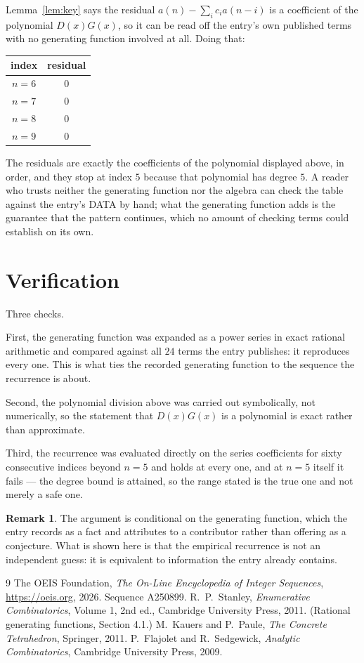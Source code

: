 \documentclass[11pt,a4paper]{article}
\theoremstyle{plain}
\theoremstyle{definition}
\newtheorem{remark}[theorem]{Remark}
\begin{document}
Lemma~\ref{lem:key} says the residual $a(n)-\sum_ic_ia(n-i)$ is a coefficient of the
polynomial $D(x)G(x)$, so it can be read off the entry's own published terms with no
generating function involved at all. Doing that:
\begin{center}
\begin{tabular}{cc}
index & residual \\ \hline
$n=6$ & $0$ \\
$n=7$ & $0$ \\
$n=8$ & $0$ \\
$n=9$ & $0$
\end{tabular}
\end{center}
The residuals are exactly the coefficients of the polynomial displayed above, in order, and
they stop at index $5$ because that polynomial has degree $5$. A reader who trusts
neither the generating function nor the algebra can check the table against the entry's DATA
by hand; what the generating function adds is the guarantee that the pattern continues, which
no amount of checking terms could establish on its own.

\section{Verification}

Three checks.

First, the generating function was expanded as a power series in exact rational arithmetic and
compared against all $24$ terms the entry publishes: it reproduces every one. This is
what ties the recorded generating function to the sequence the recurrence is about.

Second, the polynomial division above was carried out symbolically, not numerically, so the
statement that $D(x)G(x)$ is a polynomial is exact rather than approximate.

Third, the recurrence was evaluated directly on the series coefficients for sixty consecutive
indices beyond $n=5$ and holds at every one, and at $n=5$ itself it fails --- the
degree bound is attained, so the range stated is the true one and not merely a safe one.

\begin{remark}
The argument is conditional on the generating function, which the entry records as a fact and
attributes to a contributor rather than offering as a conjecture. What is shown here is that
the empirical recurrence is not an independent guess: it is equivalent to information the
entry already contains.
\end{remark}

\begin{thebibliography}{9}
 The OEIS Foundation, \emph{The On-Line Encyclopedia of Integer
Sequences}, \url{https://oeis.org}, 2026. Sequence A250899.
 R.~P.~Stanley, \emph{Enumerative Combinatorics}, Volume 1, 2nd ed.,
Cambridge University Press, 2011. (Rational generating functions, Section 4.1.)
 M.~Kauers and P.~Paule, \emph{The Concrete Tetrahedron}, Springer, 2011.
 P.~Flajolet and R.~Sedgewick, \emph{Analytic Combinatorics}, Cambridge
University Press, 2009.
\end{thebibliography}
\end{document}
